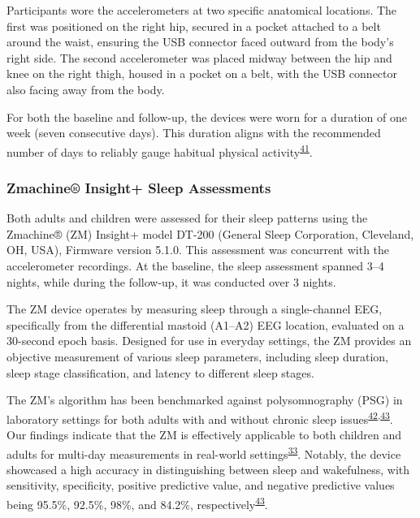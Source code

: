 \documentclass[
  9pt,
]{article}
\begin{document}
Participants wore the accelerometers at two specific anatomical
locations. The first was positioned on the right hip, secured in a
pocket attached to a belt around the waist, ensuring the USB connector
faced outward from the body's right side. The second accelerometer was
placed midway between the hip and knee on the right thigh, housed in a
pocket on a belt, with the USB connector also facing away from the body.

For both the baseline and follow-up, the devices were worn for a
duration of one week (seven consecutive days). This duration aligns with
the recommended number of days to reliably gauge habitual physical
activity\textsuperscript{\protect\hyperlink{ref-jaeschke_variability_2018}{41}}.

\hypertarget{zmachine-insight-sleep-assessments}{%
\subsubsection{Zmachine® Insight+ Sleep
Assessments}\label{zmachine-insight-sleep-assessments}}

Both adults and children were assessed for their sleep patterns using
the Zmachine® (ZM) Insight+ model DT-200 (General Sleep Corporation,
Cleveland, OH, USA), Firmware version 5.1.0. This assessment was
concurrent with the accelerometer recordings. At the baseline, the sleep
assessment spanned 3--4 nights, while during the follow-up, it was
conducted over 3 nights.

The ZM device operates by measuring sleep through a single-channel EEG,
specifically from the differential mastoid (A1--A2) EEG location,
evaluated on a 30-second epoch basis. Designed for use in everyday
settings, the ZM provides an objective measurement of various sleep
parameters, including sleep duration, sleep stage classification, and
latency to different sleep stages.

The ZM's algorithm has been benchmarked against polysomnography (PSG) in
laboratory settings for both adults with and without chronic sleep
issues\textsuperscript{\protect\hyperlink{ref-wang_evaluation_2015}{42},\protect\hyperlink{ref-kaplan_performance_2014}{43}}.
Our findings indicate that the ZM is effectively applicable to both
children and adults for multi-day measurements in real-world
settings\textsuperscript{\protect\hyperlink{ref-hees_novel_2015}{33}}.
Notably, the device showcased a high accuracy in distinguishing between
sleep and wakefulness, with sensitivity, specificity, positive
predictive value, and negative predictive values being 95.5\%, 92.5\%,
98\%, and 84.2\%,
respectively\textsuperscript{\protect\hyperlink{ref-kaplan_performance_2014}{43}}.
\end{document}
